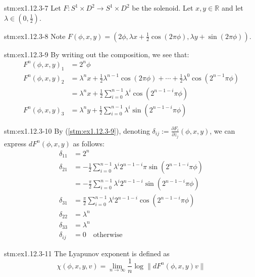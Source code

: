 \begin{statement}{stm:ex1.12.3-7}
Let $F \colon S^1 \times D^2 \to S^1 \times D^2$ be the solenoid. Let $x, y \in \mathbb{R}$ and let $\lambda \in (0, \frac{1}{2})$.
\end{statement}

\begin{statement}{stm:ex1.12.3-8}
Note $F(\phi, x, y) = (2\phi, \lambda x + \frac{1}{2} \cos(2\pi\phi), \lambda y + \sin(2\pi\phi))$.
\end{statement}

\begin{statement}{stm:ex1.12.3-9}
By writing out the composition, we see that:
\begin{align*}
F^n(\phi, x, y)_1 &= 2^n \phi \\
F^n(\phi, x, y)_2 &= \lambda^n x + \frac{1}{2} \lambda^{n-1} \cos(2\pi \phi) + \cdots + \frac{1}{2} \lambda^0 \cos(2^{n-1} \pi \phi) \\
&= \lambda^n x + \frac{1}{2} \sum_{i=0}^{n-1} \lambda^i \cos(2^{n-1-i} \pi \phi) \\
F^n(\phi, x, y)_3 &= \lambda^n y + \frac{1}{2} \sum_{i=0}^{n-1} \lambda^i \sin(2^{n-1-i} \pi \phi)
\end{align*}
\end{statement}


\begin{statement}{stm:ex1.12.3-10}
By (\ref{stm:ex1.12.3-9}), denoting $\delta_{ij} := \frac{\partial F_i}{\partial z_j}(\phi, x, y)$, we can express $dF^n(\phi, x, y)$ as follows:
\begin{align*}
\delta_{11} &= 2^n \\
\delta_{21} &= -\frac{1}{2} \sum_{i=0}^{n-1} \lambda^i 2^{n-1-i} \pi \sin(2^{n-1-i} \pi \phi) \\
&= -\frac{\pi}{2} \sum_{i=0}^{n-1} \lambda^i 2^{n-1-i} \sin(2^{n-1-i} \pi \phi) \\
\delta_{31} &= \frac{\pi}{2} \sum_{i=0}^{n-1} \lambda^i 2^{n-1-i} \cos(2^{n-1-i} \pi \phi) \\
\delta_{22} &= \lambda^n \\
\delta_{33} &= \lambda^n \\
\delta_{ij} &= 0 \quad \text{otherwise}
\end{align*}
\end{statement}


\begin{statement}{stm:ex1.12.3-11}
The Lyapunov exponent is defined as
\[
\chi(\phi, x, y, v) = \lim_{n \to \infty} \frac{1}{n} \log \| dF^n(\phi, x, y)v \|
\]
\end{statement}

